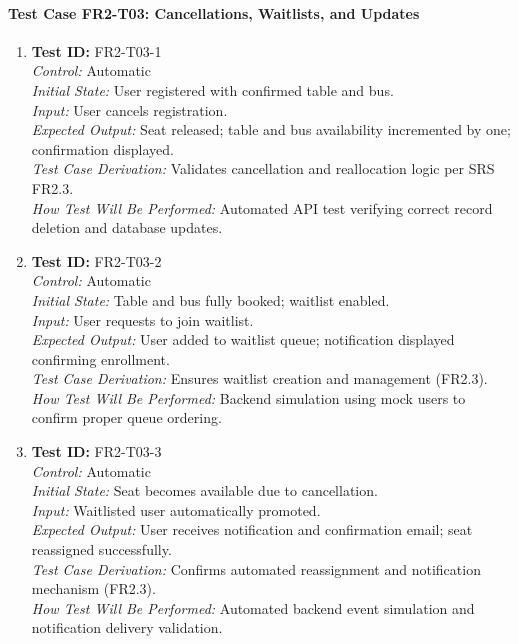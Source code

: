 \documentclass[12pt, titlepage]{article}
\begin{document}
\paragraph{Test Case FR2-T03: Cancellations, Waitlists, and Updates}

\begin{enumerate}\setlength{\itemsep}{1em}
    \item \textbf{Test ID:} FR2-T03-1\\[0.5em]
    \textit{Control:} Automatic\\[0.3em]
    \textit{Initial State:} User registered with confirmed table and bus.\\[0.3em]
    \textit{Input:} User cancels registration.\\[0.3em]
    \textit{Expected Output:} Seat released; table and bus availability incremented by one; confirmation displayed.\\[0.3em]
    \textit{Test Case Derivation:} Validates cancellation and reallocation logic per SRS FR2.3.\\[0.3em]
    \textit{How Test Will Be Performed:} Automated API test verifying correct record deletion and database updates.

    \item \textbf{Test ID:} FR2-T03-2\\[0.5em]
    \textit{Control:} Automatic\\[0.3em]
    \textit{Initial State:} Table and bus fully booked; waitlist enabled.\\[0.3em]
    \textit{Input:} User requests to join waitlist.\\[0.3em]
    \textit{Expected Output:} User added to waitlist queue; notification displayed confirming enrollment.\\[0.3em]
    \textit{Test Case Derivation:} Ensures waitlist creation and management (FR2.3).\\[0.3em]
    \textit{How Test Will Be Performed:} Backend simulation using mock users to confirm proper queue ordering.

    \item \textbf{Test ID:} FR2-T03-3\\[0.5em]
    \textit{Control:} Automatic\\[0.3em]
    \textit{Initial State:} Seat becomes available due to cancellation.\\[0.3em]
    \textit{Input:} Waitlisted user automatically promoted.\\[0.3em]
    \textit{Expected Output:} User receives notification and confirmation email; seat reassigned successfully.\\[0.3em]
    \textit{Test Case Derivation:} Confirms automated reassignment and notification mechanism (FR2.3).\\[0.3em]
    \textit{How Test Will Be Performed:} Automated backend event simulation and notification delivery validation.
\end{enumerate}
\end{document}
